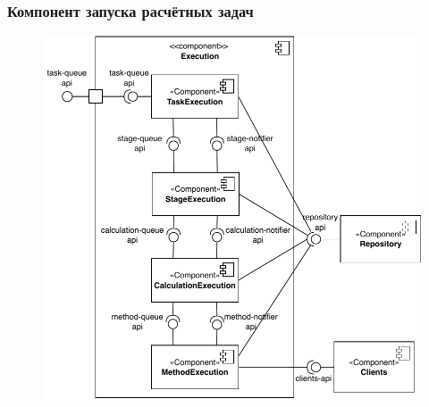 \begin{frame}
\frametitle{Компонент запуска расчётных задач}
\begin{figure}
    \includegraphics[scale=.5]{pictures/architecture/orchestrator_component_detailed}
\end{figure}
\end{frame}
